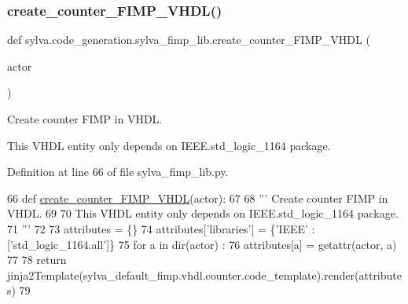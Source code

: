 \mbox{\label{namespacesylva_1_1code__generation_1_1sylva__fimp__lib_a88f096923aae1db8e521fcc0f7eda467}} 
\subsubsection{\texorpdfstring{create\+\_\+counter\+\_\+\+F\+I\+M\+P\+\_\+\+V\+H\+D\+L()}{create\_counter\_FIMP\_VHDL()}}
{\footnotesize\ttfamily def sylva.\+code\+\_\+generation.\+sylva\+\_\+fimp\+\_\+lib.\+create\+\_\+counter\+\_\+\+F\+I\+M\+P\+\_\+\+V\+H\+DL (\begin{DoxyParamCaption}\item[{}]{actor }\end{DoxyParamCaption})}

\begin{DoxyVerb}Create counter FIMP in VHDL.

This VHDL entity only depends on IEEE.std_logic_1164 package.
\end{DoxyVerb}
 

Definition at line 66 of file sylva\+\_\+fimp\+\_\+lib.\+py.


\begin{DoxyCode}
66   \textcolor{keyword}{def }\hyperlink{namespacesylva_1_1code__generation_1_1sylva__fimp__lib_a88f096923aae1db8e521fcc0f7eda467}{create\_counter\_FIMP\_VHDL}(actor):
67 
68     \textcolor{stringliteral}{''' Create counter FIMP in VHDL.}
69 \textcolor{stringliteral}{}
70 \textcolor{stringliteral}{    This VHDL entity only depends on IEEE.std\_logic\_1164 package.}
71 \textcolor{stringliteral}{    '''}
72 
73     attributes = \{\}
74     attributes[\textcolor{stringliteral}{'libraries'}] = \{\textcolor{stringliteral}{'IEEE'} : [\textcolor{stringliteral}{'std\_logic\_1164.all'}]\}
75     \textcolor{keywordflow}{for} a \textcolor{keywordflow}{in} dir(actor) :
76       attributes[a] = getattr(actor, a)
77 
78     \textcolor{keywordflow}{return} jinja2Template(sylva\_default\_fimp.vhdl.counter.code\_template).render(attributes)
79 
\end{DoxyCode}
\mbox{\label{namespacesylva_1_1code__generation_1_1sylva__fimp__lib_a2b2a9cfce91fc3139513beb93c8307ce}} 
